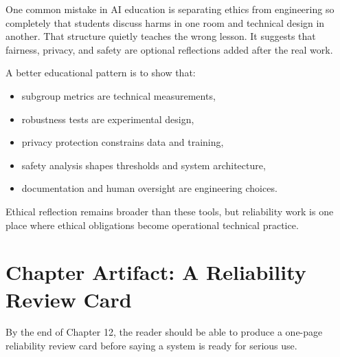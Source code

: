 One common mistake in AI education is separating ethics from engineering so completely that students discuss harms in one room and technical design in another. That structure quietly teaches the wrong lesson. It suggests that fairness, privacy, and safety are optional reflections added after the real work.

A better educational pattern is to show that:
\begin{itemize}[leftmargin=*]
\item subgroup metrics are technical measurements,
\item robustness tests are experimental design,
\item privacy protection constrains data and training,
\item safety analysis shapes thresholds and system architecture,
\item documentation and human oversight are engineering choices.
\end{itemize}

Ethical reflection remains broader than these tools, but reliability work is one place where ethical obligations become operational technical practice.

\section{Chapter Artifact: A Reliability Review Card}

By the end of Chapter 12, the reader should be able to produce a one-page reliability review card before saying a system is ready for serious use.

